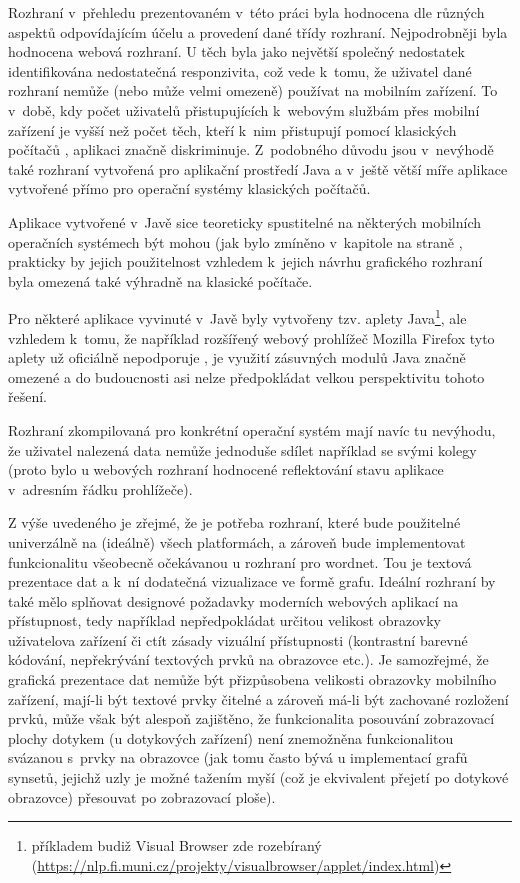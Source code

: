 \documentclass[a4paper, 11pt, oneside, showtrims]{book}
\newcommand{\itNameRef}[1]{\textit{\nameref{#1}}}
\begin{document}
			Rozhraní v~přehledu prezentovaném v~této práci byla hodnocena dle různých aspektů odpovídajícím účelu a provedení dané třídy rozhraní. Nejpodrobněji byla hodnocena webová rozhraní. U těch byla jako největší společný nedostatek identifikována nedostatečná responzivita, což vede k~tomu, že uživatel dané rozhraní nemůže (nebo může velmi omezeně) používat na mobilním zařízení. To v~době, kdy počet uživatelů přistupujících k~webovým službám přes mobilní zařízení je vyšší než počet těch, kteří k~nim přistupují pomocí klasických počítačů \parencite{Heisler2016}, aplikaci značně diskriminuje. Z~podobného důvodu jsou v~nevýhodě také rozhraní vytvořená pro aplikační prostředí Java a v~ještě větší míře aplikace vytvořené přímo pro operační systémy klasických počítačů. 

			Aplikace vytvořené v~Javě sice teoreticky spustitelné na některých mobilních operačních systémech být mohou (jak bylo zmíněno v~kapitole \itNameRef{cha:structhodnoc} na straně \pageref{cha:structhodnoc}, prakticky by jejich použitelnost vzhledem k~jejich návrhu grafického rozhraní byla omezená také výhradně na klasické počítače. 

			Pro některé aplikace vyvinuté v~Javě byly vytvořeny tzv. aplety Java\footnote{příkladem budiž Visual Browser zde rozebíraný (\url{https://nlp.fi.muni.cz/projekty/visualbrowser/applet/index.html})}, ale vzhledem k~tomu, že například rozšířený webový prohlížeč Mozilla Firefox tyto aplety už oficiálně nepodporuje \parencite{MozzilaFoundation2017}, je využití zásuvných modulů Java značně omezené a do budoucnosti asi nelze předpokládat velkou perspektivitu tohoto řešení.

			Rozhraní zkompilovaná pro konkrétní operační systém mají navíc tu nevýhodu, že uživatel nalezená data nemůže jednoduše sdílet například se svými kolegy (proto bylo u webových rozhraní hodnocené reflektování stavu aplikace v~adresním řádku prohlížeče). 

			Z výše uvedeného je zřejmé, že je potřeba rozhraní, které bude použitelné univerzálně na (ideálně) všech platformách, a zároveň bude implementovat funkcionalitu všeobecně očekávanou u rozhraní pro wordnet. Tou je textová prezentace dat a k~ní dodatečná vizualizace ve formě grafu. Ideální rozhraní by také mělo splňovat designové požadavky moderních webových aplikací na přístupnost, tedy například nepředpokládat určitou velikost obrazovky uživatelova zařízení či ctít zásady vizuální přístupnosti (kontrastní barevné kódování, nepřekrývání textových prvků na obrazovce etc.). Je samozřejmé, že grafická prezentace dat nemůže být přizpůsobena velikosti obrazovky mobilního zařízení, mají-li být textové prvky čitelné a zároveň má-li být zachované rozložení prvků, může však být alespoň zajištěno, že funkcionalita posouvání zobrazovací plochy dotykem (u dotykových zařízení) není znemožněna funkcionalitou svázanou s~prvky na obrazovce (jak tomu často bývá u implementací grafů synsetů, jejichž uzly je možné tažením myší (což je ekvivalent přejetí po dotykové obrazovce) přesouvat po zobrazovací ploše). 
\end{document}
